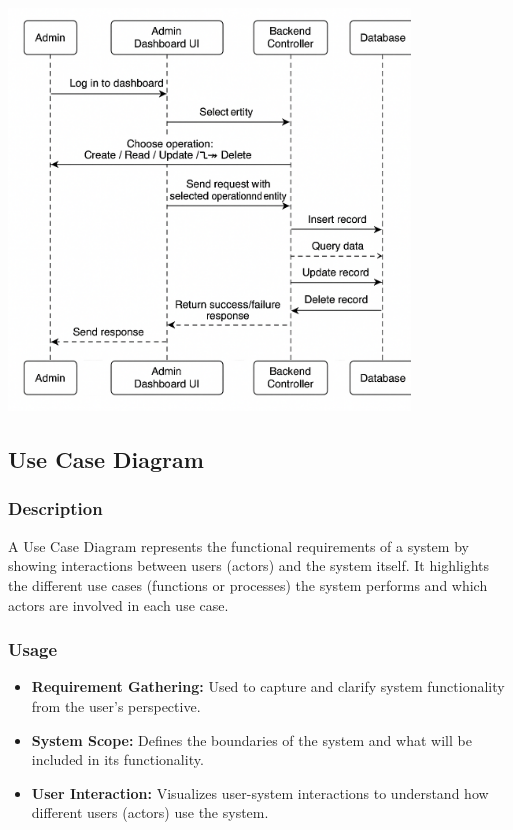 \vspace{0.5cm}
\begin{center}
\includegraphics[width=0.8\textwidth]{./figures/Sequence Diagram/4_crud_sequence.png} %
\end{center}
\vspace{0.5cm}

\subsection{Use Case Diagram}
\subsubsection{Description}
A Use Case Diagram represents the functional requirements of a system by showing interactions between users (actors) and the system itself. It highlights the different use cases (functions or processes) the system performs and which actors are involved in each use case.

\subsubsection{Usage}
\begin{itemize}
    \item \textbf{Requirement Gathering:} Used to capture and clarify system functionality from the user's perspective.
    \item \textbf{System Scope:} Defines the boundaries of the system and what will be included in its functionality.
    \item \textbf{User Interaction:} Visualizes user-system interactions to understand how different users (actors) use the system.
\end{itemize}

